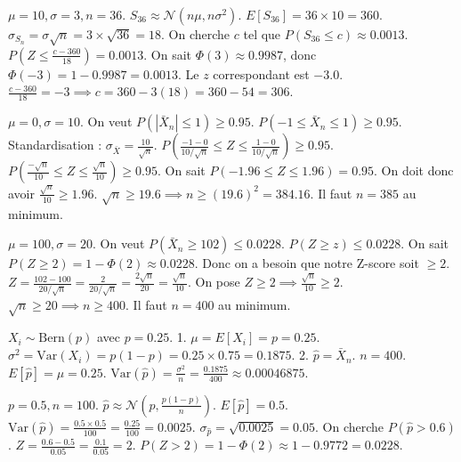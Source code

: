 \begin{correctionbox}
$\mu=10, \sigma=3, n=36$. $S_{36} \approx \mathcal{N}(n\mu, n\sigma^2)$.
$E[S_{36}] = 36 \times 10 = 360$.
$\sigma_{S_n} = \sigma\sqrt{n} = 3 \times \sqrt{36} = 18$.
On cherche $c$ tel que $P(S_{36} \le c) \approx 0.0013$.
$P(Z \le \frac{c - 360}{18}) = 0.0013$.
On sait $\Phi(3) \approx 0.9987$, donc $\Phi(-3) = 1 - 0.9987 = 0.0013$.
Le $z$ correspondant est $-3.0$.
$\frac{c - 360}{18} = -3 \implies c = 360 - 3(18) = 360 - 54 = 306$.
\end{correctionbox}

\begin{correctionbox}
$\mu=0, \sigma=10$. On veut $P(|\bar{X}_n| \le 1) \ge 0.95$.
$P(-1 \le \bar{X}_n \le 1) \ge 0.95$.
Standardisation : $\sigma_{\bar{X}} = \frac{10}{\sqrt{n}}$.
$P\left( \frac{-1 - 0}{10/\sqrt{n}} \le Z \le \frac{1 - 0}{10/\sqrt{n}} \right) \ge 0.95$.
$P\left( \frac{-\sqrt{n}}{10} \le Z \le \frac{\sqrt{n}}{10} \right) \ge 0.95$.
On sait $P(-1.96 \le Z \le 1.96) = 0.95$.
On doit donc avoir $\frac{\sqrt{n}}{10} \ge 1.96$.
$\sqrt{n} \ge 19.6 \implies n \ge (19.6)^2 = 384.16$.
Il faut $n = 385$ au minimum.
\end{correctionbox}

\begin{correctionbox}
$\mu=100, \sigma=20$. On veut $P(\bar{X}_n \ge 102) \le 0.0228$.
$P(Z \ge z) \le 0.0228$. On sait $P(Z \ge 2) = 1 - \Phi(2) \approx 0.0228$.
Donc on a besoin que notre Z-score soit $\ge 2$.
$Z = \frac{102 - 100}{20 / \sqrt{n}} = \frac{2}{20 / \sqrt{n}} = \frac{2\sqrt{n}}{20} = \frac{\sqrt{n}}{10}$.
On pose $Z \ge 2 \implies \frac{\sqrt{n}}{10} \ge 2$.
$\sqrt{n} \ge 20 \implies n \ge 400$.
Il faut $n = 400$ au minimum.
\end{correctionbox}

\begin{correctionbox}
$X_i \sim \text{Bern}(p)$ avec $p=0.25$.
1.  $\mu = E[X_i] = p = 0.25$.
    $\sigma^2 = \text{Var}(X_i) = p(1-p) = 0.25 \times 0.75 = 0.1875$.
2.  $\hat{p} = \bar{X}_n$. $n=400$.
    $E[\hat{p}] = \mu = 0.25$.
    $\text{Var}(\hat{p}) = \frac{\sigma^2}{n} = \frac{0.1875}{400} \approx 0.00046875$.
\end{correctionbox}

\begin{correctionbox}
$p=0.5, n=100$. $\hat{p} \approx \mathcal{N}(p, \frac{p(1-p)}{n})$.
$E[\hat{p}] = 0.5$.
$\text{Var}(\hat{p}) = \frac{0.5 \times 0.5}{100} = \frac{0.25}{100} = 0.0025$.
$\sigma_{\hat{p}} = \sqrt{0.0025} = 0.05$.
On cherche $P(\hat{p} > 0.6)$.
$Z = \frac{0.6 - 0.5}{0.05} = \frac{0.1}{0.05} = 2$.
$P(Z > 2) = 1 - \Phi(2) \approx 1 - 0.9772 = 0.0228$.
\end{correctionbox}

